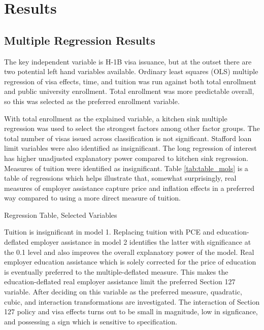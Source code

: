 \documentclass[review]{elsarticle}
\begin{document}
    \section{Results}

    \subsection{Multiple Regression Results}
    The key independent variable is H-1B visa issuance, but at the outset there are two potential left hand variables available.
    Ordinary least squares (OLS) multiple regression of visa effects, time, and tuition was run against both total enrollment and public university enrollment.
    Total enrollment was more predictable overall, so this was selected as the preferred enrollment variable.

    With total enrollment as the explained variable,
    a kitchen sink multiple regression was used to select the strongest factors among other factor groups.
    The total number of visas issued across classification is not significant.
    Stafford loan limit variables were also identified as insignificant.
    The long regression of interest has higher unadjusted explanatory power compared to kitchen sink regression.
    Measures of tuition were identified as insignificant.
    Table \ref{tab:table_mols} is a table of regressions which helps illustrate that, somewhat surprisingly,
    real measures of employer assistance capture price and inflation effects in a preferred way
    compared to using a more direct measure of tuition.

    \begin{table}
        \caption{Regression Table, Selected Variables}
        \resizebox{\columnwidth}{!}{
            
        }
        \label{tab:table_mols}
        \end{table}

    Tuition is insignificant in model 1.
    Replacing tuition with PCE and education-deflated employer assistance in model 2 identifies the latter
    with significance at the 0.1 level and also improves the overall explanatory power of the model.
    Real employer education assistance which is solely corrected for the price of education
    is eventually preferred to the multiple-deflated measure.
    This makes the education-deflated real employer assistance limit the preferred Section 127 variable.
    After deciding on this variable as the preferred measure,
    quadratic, cubic, and interaction transformations are investigated.
    The interaction of Section 127 policy and visa effects turns out to be small in magnitude,
    low in signficance,
    and possessing a sign which is sensitive to specification.
\end{document}
